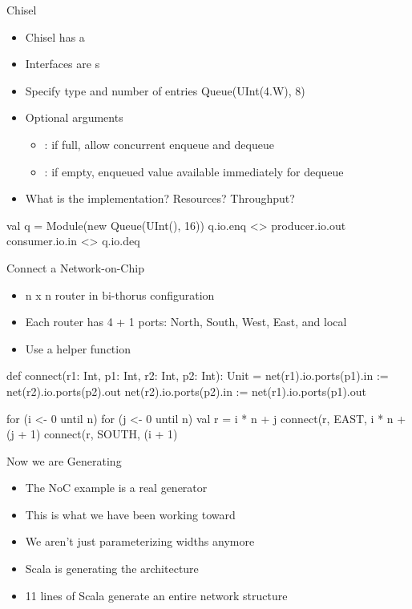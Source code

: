\begin{frame}[fragile]{Chisel }
\begin{itemize}
\item Chisel has a 
\item Interfaces are s
\item Specify type and number of entries Queue(UInt(4.W), 8)
\item Optional arguments
\begin{itemize}
\item {}: if full, allow concurrent enqueue and dequeue
\item {}: if empty, enqueued value available immediately for dequeue
\end{itemize}
\item What is the implementation? Resources? Throughput?
\end{itemize}
\begin{chisel}
val q = Module(new Queue(UInt(), 16))
q.io.enq <> producer.io.out
consumer.io.in <> q.io.deq
\end{chisel}
\end{frame}

\begin{frame}[fragile]{Connect a Network-on-Chip}
\begin{itemize}
\item n x n router in bi-thorus configuration
\item Each router has 4 + 1 ports: North, South, West, East, and local
\item Use a helper function 
\end{itemize}
\begin{chisel}
  def connect(r1: Int, p1: Int, r2: Int, p2: Int): Unit = {
    net(r1).io.ports(p1).in := net(r2).io.ports(p2).out
    net(r2).io.ports(p2).in := net(r1).io.ports(p1).out
  }

  for (i <- 0 until n) {
    for (j <- 0 until n) {
      val r = i * n + j
      connect(r, EAST, i * n + (j + 1) %
      connect(r, SOUTH, (i + 1) %
    }
  }
\end{chisel}
\end{frame}

\begin{frame}[fragile]{Now we are Generating}
\begin{itemize}
\item The NoC example is a real generator
\item This is what we have been working toward
\item We aren't just parameterizing widths anymore
\item Scala is generating the architecture
\item 11 lines of Scala generate an entire network structure
\end{itemize}
\end{frame}

